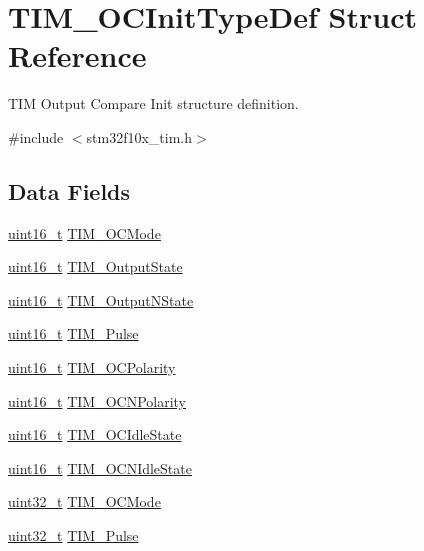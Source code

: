 \hypertarget{struct_t_i_m___o_c_init_type_def}{\section{T\-I\-M\-\_\-\-O\-C\-Init\-Type\-Def Struct Reference}
\label{struct_t_i_m___o_c_init_type_def}
}


T\-I\-M Output Compare Init structure definition.  




{\ttfamily \#include $<$stm32f10x\-\_\-tim.\-h$>$}

\subsection*{Data Fields}
\begin{DoxyCompactItemize}
\item 
\hyperlink{stdint_8h_a273cf69d639a59973b6019625df33e30}{uint16\-\_\-t} \hyperlink{struct_t_i_m___o_c_init_type_def_ad4338ed2415b0d6d19589bf72b7ba3b0}{T\-I\-M\-\_\-\-O\-C\-Mode}
\item 
\hyperlink{stdint_8h_a273cf69d639a59973b6019625df33e30}{uint16\-\_\-t} \hyperlink{struct_t_i_m___o_c_init_type_def_a2baca9c02d214d3125635a74e8d9aee4}{T\-I\-M\-\_\-\-Output\-State}
\item 
\hyperlink{stdint_8h_a273cf69d639a59973b6019625df33e30}{uint16\-\_\-t} \hyperlink{struct_t_i_m___o_c_init_type_def_a933904d2f892d0b945a908b9257fe869}{T\-I\-M\-\_\-\-Output\-N\-State}
\item 
\hyperlink{stdint_8h_a273cf69d639a59973b6019625df33e30}{uint16\-\_\-t} \hyperlink{struct_t_i_m___o_c_init_type_def_ab4a2620c38029b136be560041173375d}{T\-I\-M\-\_\-\-Pulse}
\item 
\hyperlink{stdint_8h_a273cf69d639a59973b6019625df33e30}{uint16\-\_\-t} \hyperlink{struct_t_i_m___o_c_init_type_def_a9ed3e2de4700d008729a916d8ba78486}{T\-I\-M\-\_\-\-O\-C\-Polarity}
\item 
\hyperlink{stdint_8h_a273cf69d639a59973b6019625df33e30}{uint16\-\_\-t} \hyperlink{struct_t_i_m___o_c_init_type_def_a3e47e672810747302c9d0626ae2ccb17}{T\-I\-M\-\_\-\-O\-C\-N\-Polarity}
\item 
\hyperlink{stdint_8h_a273cf69d639a59973b6019625df33e30}{uint16\-\_\-t} \hyperlink{struct_t_i_m___o_c_init_type_def_a2a28f2d62339e06caef12816e04a8f55}{T\-I\-M\-\_\-\-O\-C\-Idle\-State}
\item 
\hyperlink{stdint_8h_a273cf69d639a59973b6019625df33e30}{uint16\-\_\-t} \hyperlink{struct_t_i_m___o_c_init_type_def_a6cbbe6eb87c2ab49e4d68fa9703ce949}{T\-I\-M\-\_\-\-O\-C\-N\-Idle\-State}
\item 
\hyperlink{stdint_8h_a435d1572bf3f880d55459d9805097f62}{uint32\-\_\-t} \hyperlink{struct_t_i_m___o_c_init_type_def_a99dec30fcc0710fd304a6ba4a92c3f12}{T\-I\-M\-\_\-\-O\-C\-Mode}
\item 
\hyperlink{stdint_8h_a435d1572bf3f880d55459d9805097f62}{uint32\-\_\-t} \hyperlink{struct_t_i_m___o_c_init_type_def_ab4a2620c38029b136be560041173375d}{T\-I\-M\-\_\-\-Pulse}
\end{DoxyCompactItemize}



